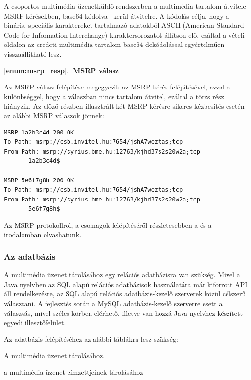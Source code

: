 A csoportos multimédia üzenetküldő rendszerben a multimédia tartalom átvitele MSRP kérésekben, base64 kódolva~\cite{rfc4648} kerül átvitelre. A kódolás célja, hogy a bináris, speciális karaktereket tartalmazó adatokból ASCII (American Standard Code for Information Interchange) karaktersorozatot állítson elő, ezáltal a vételi oldalon az eredeti multimédia tartalom base64 dekódolással egyértelműen visszaállítható lesz.
\bigskip

\noindent
{\bf \ref{enum:msrp_resp}.~MSRP válasz}

Az MSRP válasz felépítése megegyezik az MSRP kérés felépítésével, azzal a különbséggel, hogy a válaszban nincs tartalom átvitel, ezáltal a törzs rész hiányzik. Az előző részben illusztrált két MSRP kérésre sikeres kézbesítés esetén az alábbi MSRP válaszok jönnek:
\fontsize{10}{10}
\begin{verbatim}
MSRP 1a2b3c4d 200 OK
To-Path: msrp://csb.invitel.hu:7654/jshA7weztas;tcp
From-Path: msrp://syrius.bme.hu:12763/kjhd37s2s20w2a;tcp
-------1a2b3c4d$

MSRP 5e6f7g8h 200 OK
To-Path: msrp://csb.invitel.hu:7654/jshA7weztas;tcp
From-Path: msrp://syrius.bme.hu:12763/kjhd37s2s20w2a;tcp
-------5e6f7g8h$
\end{verbatim}
\fontsize{12}{12} 

\bigskip

Az MSRP protokollról, a csomagok felépítéséről részletesebben a \cite{rfc4975} és a \cite{rfc4976} irodalomban olvashatunk.

\subsubsection{Az adatbázis}
\label{sec:adatb}

A multimédia üzenet tárolásához egy relációs adatbázisra van szükség. Mivel a Java nyelvben az SQL alapú relációs adatbázisok használatára már kiforrott API áll rendelkezésre, az SQL alapú relációs adatbázis-kezelő szerverek közül célszerű választani. A fejlesztés során a MySQL adatbázis-kezelő szerverre esett a választás, mivel széles körben elérhető, illetve van hozzá Java nyelvhez készített egyedi illesztőfelület.

Az adatbázis felépítéséhez az alábbi táblákra lesz szükség:

\begin{myitemize}
\item A multimédia üzenet tárolásához,
\item a multimédia üzenet címzettjeinek tárolásához
\end{myitemize}

